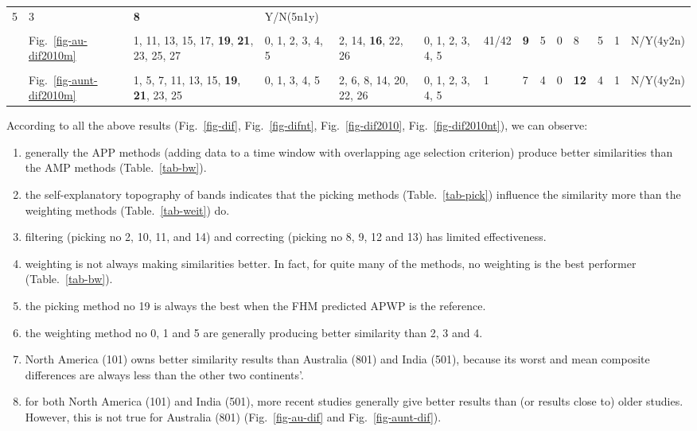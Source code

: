 \begin{table*}
{\begin{tabular}{l|l|l|l|l|l|l|l|l|l|l|l|l|l}
  5 & 3 & \textbf{8} & Y/N(5n1y) \\ \\ \cline{2-14}
& Fig.~\ref{fig-au-dif2010m} & \multirow{2}{*}{\parbox{2cm}{1, 11, 13, 15, 17,
  \textbf{19}, \textbf{21}, 23, 25, 27}} & \multirow{2}{*}{\parbox{1cm}{0, 1, 2, 3, 4, 5}} &
  \multirow{2}{*}{\parbox{2cm}{2, 14, \textbf{16}, 22, 26}} &
  \multirow{2}{*}{\parbox{1cm}{0, 1, 2, 3, 4, 5}} & 41/42 & \textbf{9} & 5 & 0 & 8 & 5
  & 1 & N/Y(4y2n) \\ \\ \cline{2-14}
& Fig.~\ref{fig-aunt-dif2010m} & \multirow{2}{*}{\parbox{2cm}{1, 5, 7, 11, 13, 15,
  \textbf{19}, \textbf{21}, 23, 25}} & \multirow{2}{*}{\parbox{1cm}{0, 1, 3, 4, 5}} &
  \multirow{2}{*}{\parbox{2cm}{2, 6, 8, 14, 20, 22, 26}} &
  \multirow{2}{*}{\parbox{1cm}{0, 1, 2, 3, 4, 5}} & 1 & 7 & 4 & 0 & \textbf{12} & 4
  & 1 & N/Y(4y2n)
\end{tabular}%
}
\end{table*}

According to all the above results (Fig.~\ref{fig-dif}, Fig.~\ref{fig-difnt},
Fig.~\ref{fig-dif2010}, Fig.~\ref{fig-dif2010nt}), we can observe:
%
\begin{enumerate}
  \item generally the APP methods (adding data to a time window with overlapping
        age selection criterion) produce better similarities than the AMP
        methods (Table.~\ref{tab-bw}).
  \item the self-explanatory topography of bands indicates that the picking
        methods (Table.~\ref{tab-pick}) influence the similarity more than the
        weighting methods (Table.~\ref{tab-weit}) do.
  \item filtering (picking no 2, 10, 11, and 14) and
        correcting (picking no 8, 9, 12 and 13) has limited effectiveness.
  \item weighting is not always making similarities better. In fact, for quite
        many of the methods, no weighting is the best performer
		(Table.~\ref{tab-bw}).
  \item the picking method no 19 is always the best when the FHM predicted APWP
		is the reference.
  \item the weighting method no 0, 1 and 5 are generally producing better
        similarity than 2, 3 and 4.
  \item North America (101) owns better similarity results than Australia (801)
        and India (501), because its worst and mean composite differences are
		always less than the other two continents'.
  \item for both North America (101) and India (501), more recent studies
        generally give better results than (or results close to) older studies.
		However, this is not true for Australia (801) (Fig.~\ref{fig-au-dif} and
		Fig.~\ref{fig-aunt-dif}).
\end{enumerate}

